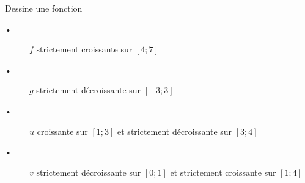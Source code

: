 
Dessine une fonction
\begin{description}
\item[•] $f$ strictement croissante sur $[4;7]$
\item[•] $g$ strictement décroissante sur $[-3;3]$
\item[•] $u$ croissante sur $[1;3]$ et strictement décroissante sur $[3;4]$
\item[•] $v$ strictement décroissante sur $[0;1]$ et strictement croissante sur $[1;4]$
\end{description}
